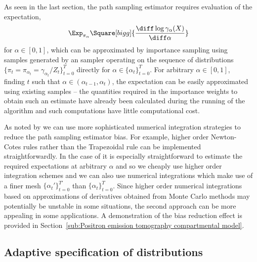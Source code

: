 As seen in the last section, the path sampling estimator requires evaluation
of the expectation,
\begin{equation*}
  \Exp_{\pi_\alpha}\Square[bigg]{
    \frac{\diff\log\gamma_{\alpha}(X)}{\diff\alpha}}
\end{equation*}
for $\alpha\in[0,1]$, which can be approximated by importance sampling using
samples generated by an \smc sampler operating on the sequence of
distributions $\{\pi_t = \pi_{\alpha_t} = \gamma_{\alpha_t}/Z_t\}_{t=0}^T$
directly for $\alpha\in\{\alpha_t\}_{t=0}^T$. For arbitrary $\alpha\in[0,1]$,
finding $t$ such that $\alpha\in(\alpha_{t-1},\alpha_t)$, the expectation can
be easily approximated using existing \smc samples -- the quantities required
in the importance weights to obtain such an estimate have already been
calculated during the running of the \smc algorithm and such computations have
little computational cost.

As noted by \cite{Friel:2012}  we can use more sophisticated numerical
integration strategies to reduce the path sampling estimator bias. For
example, higher order Newton-Cotes rules rather than the Trapezoidal rule can
be implemented straightforwardly. In the case of \smc it is especially
straightforward to estimate the required expectations at arbitrary $\alpha$
and so we cheaply use higher order integration schemes and we can also use
numerical integrations which make use of a finer mesh
$\{\alpha_t'\}_{t=0}^{T'}$ than $\{\alpha_t\}_{t=0}^T$. Since higher order
numerical integrations based on approximations of derivatives obtained from
Monte Carlo methods may potentially be unstable in some situations, the second
approach can be more appealing in some applications. A demonstration of the
bias reduction effect is provided in Section~\ref{sub:Positron emission
  tomography compartmental model}.

\subsection{Adaptive specification of distributions}
\label{sub:Adaptive specification of distributions}

